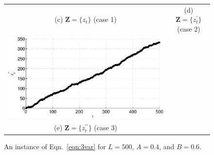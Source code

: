 \begin{figure}[ht]
\begin{tabular}{cc}
(c) $\mathbf{Z} = \{z_t\}$ (case 1)& (d) $\mathbf{Z} = \{z_t^\prime\}$ (case 2) \\
\includegraphics[scale=0.48]{NoisyMultiResponseExample_z3.eps} &  \\
(e) $\mathbf{Z} = \{z_t^{\prime\prime}\}$ (case 3)& 
\end{tabular}
\caption{An instance of Eqn.\ \ref{eqn:3var} for $L=500$, $A=0.4$, and $B=0.6$.}
\label{fig:3varxyplot}
\end{figure}
